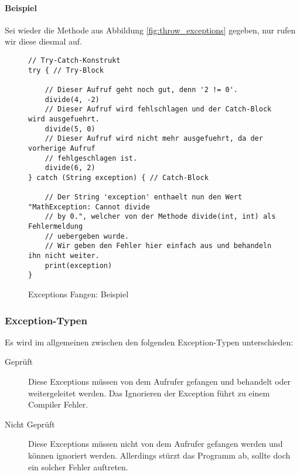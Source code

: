 		\paragraph{Beispiel}
			Sei wieder die Methode aus Abbildung \ref{fig:throw_exceptions} gegeben, nur rufen wir diese diesmal auf.
			\begin{figure}[H]
				\centering
				\begin{lstlisting}
// Try-Catch-Konstrukt
try { // Try-Block

	// Dieser Aufruf geht noch gut, denn '2 != 0'.
	divide(4, -2)
	// Dieser Aufruf wird fehlschlagen und der Catch-Block wird ausgefuehrt.
	divide(5, 0)
	// Dieser Aufruf wird nicht mehr ausgefuehrt, da der vorherige Aufruf
	// fehlgeschlagen ist.
	divide(6, 2)
} catch (String exception) { // Catch-Block

	// Der String 'exception' enthaelt nun den Wert "MathException: Cannot divide
	// by 0.", welcher von der Methode divide(int, int) als Fehlermeldung
	// uebergeben wurde.
	// Wir geben den Fehler hier einfach aus und behandeln ihn nicht weiter.
	print(exception)
}
				\end{lstlisting}
				\caption{Exceptions Fangen: Beispiel}
			\end{figure}
	
	\subsubsection{Exception-Typen}
		Es wird im allgemeinen zwischen den folgenden Exception-Typen unterschieden:
		\begin{description}
			\item[Geprüft] Diese Exceptions müssen von dem Aufrufer gefangen und behandelt oder weitergeleitet werden. Das Ignorieren der Exception führt zu einem Compiler Fehler.
			\item[Nicht Geprüft] Diese Exceptions müssen nicht von dem Aufrufer gefangen werden und können ignoriert werden. Allerdings stürzt das Programm ab, sollte doch ein solcher Fehler auftreten.
		\end{description}
		
